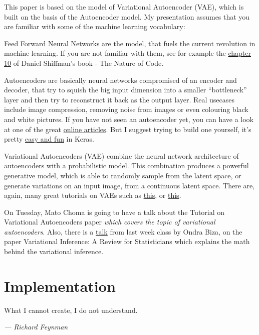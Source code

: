 \documentclass{article}
\begin{document}
This paper is based on the model of Variational Autoencoder (VAE), which is built on the basis of the Autoencoder model. My presentation assumes that you are familiar with some of the machine learning vocabulary:
\begin{description}
    \item{Feed Forward Neural Networks} are the model, that fuels the current revolution in machine learning. If you are not familiar with them, see for example the \href{https://natureofcode.com/book/chapter-10-neural-networks/}{chapter 10} of Daniel Shiffman's book - The Nature of Code.
    \item{Autoencoders} are basically neural networks compromised of an encoder and decoder, that try to squish the big input dimension into a smaller ``bottleneck'' layer and then try to reconstruct it back as the output layer. Real usecases include image compression, removing noise from images or even colouring black and white pictures. If you have not seen an autoencoder yet, you can have a look at one of the great \href{https://towardsdatascience.com/applied-deep-learning-part-3-autoencoders-1c083af4d798}{online articles}. But I suggest trying to build one yourself, it's pretty \href{https://blog.keras.io/building-autoencoders-in-keras.html}{easy and fun} in Keras.
    \item{Variational Autoencoders (VAE)} combine the neural network architecture of autoencoders with a probabilistic model. This combination produces a powerful generative model, which is able to randomly sample from the latent space, or generate variations on an input image, from a continuous latent space. There are, again, many great tutorials on VAEs such as \href{https://jaan.io/what-is-variational-autoencoder-vae-tutorial/}{this}, or \href{https://towardsdatascience.com/intuitively-understanding-variational-autoencoders-1bfe67eb5daf}{this}.
\end{description}

On Tuesday, Mato Choma is going to have a talk about the Tutorial on Variational Autoencoders\cite{doersch2016tutorial} paper \emph{which covers the topic of variational autoencoders}. Also, there is a \href{https://courses.fit.cvut.cz/BI-SZ1/talks/2019/03/handout.pdf}{talk} from last week class by Ondra Biza, on the paper Variational Inference: A Review for Statisticians\cite{blei2017variational} which explains the math behind the variational inference.

\clearpage
\section{Implementation}
\epigraph{What I cannot create, I do not understand.}{\textit{--- Richard Feynman}}
\end{document}
